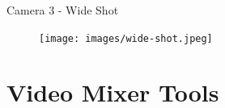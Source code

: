 \documentclass[aspectratio=169]{beamer}
\begin{document}
\begin{frame}{Camera 3 - Wide Shot}
	\begin{figure} 
		\centering
		\texttt{[image: images/wide-shot.jpeg]}
	\end{figure}
\end{frame}


\section{Video Mixer Tools}

%
\end{document}
